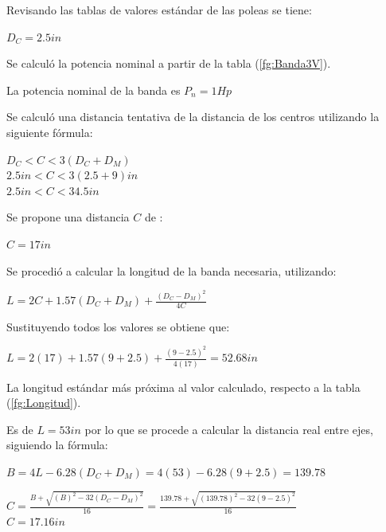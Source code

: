 Revisando las tablas de valores estándar de las poleas se tiene:

\begin{center}
	$D_C = 2.5 in$
\end{center}

Se calculó la potencia nominal a partir de la tabla (\ref{fg:Banda3V}).

La potencia nominal de la banda es $P_n = 1 Hp$

Se calculó una distancia tentativa de la distancia de los centros utilizando la siguiente fórmula:

\begin{center}
	$ D_C < C < 3(D_C + D_M)$ \\
	$ 2.5 in < C < 3(2.5 + 9) in$ \\
	$ 2.5 in < C < 34.5 in $
\end{center}


Se propone una distancia $C$ de :

\begin{center}
	$C=17 in $
\end{center}

Se procedió a calcular la longitud de la banda necesaria, utilizando:
 
\begin{center}
	$L = 2C  + 1.57(D_C + D_M) + \frac{(D_C - D_M)^2}{4C}$ \\
\end{center}

Sustituyendo todos los valores se obtiene que:

\begin{center}
	$L =2(17) +1.57(9 + 2.5)+ \frac{(9 - 2.5)^2}{4(17)} = 52.68 in$
\end{center}

La longitud estándar más próxima al valor calculado, respecto a la tabla (\ref{fg:Longitud}).

Es de $L=53 in$ por lo que se procede a calcular la distancia real entre ejes, siguiendo la fórmula:

\begin{center}
	$B = 4L-6.28(D_C + D_M) = 4(53)-6.28(9 + 2.5) = 139.78$
	
\end{center}
	
\begin{center}
	$C = \frac{B+ \sqrt{(B)^2 - 32(D_C - D_M)^2}}{16} = \frac{139.78+ \sqrt{(139.78)^2 - 32(9 - 2.5)^2}}{16}$ \\
	$C=17.16 in$
\end{center}

